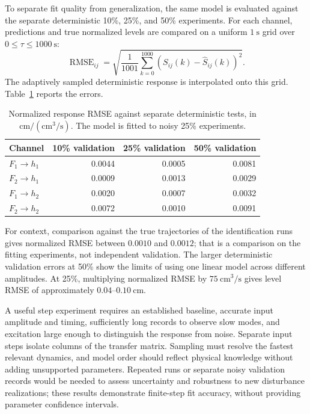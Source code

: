 To separate fit quality from generalization, the same model is evaluated
against the separate deterministic 10\%, 25\%, and 50\% experiments.
For each channel, predictions and true normalized levels are compared
on a uniform $1\ \mathrm{s}$ grid over $0\leq\tau\leq1000\ \mathrm{s}$:
\begin{equation}
 \operatorname{RMSE}_{ij}=
 \sqrt{\frac{1}{1001}\sum_{k=0}^{1000}
  \left(S_{ij}(k)-\widehat S_{ij}(k)\right)^2}.
\end{equation}
The adaptively sampled deterministic response is interpolated onto this
grid. Table~\ref{tab:p4-validation} reports the errors.
\begin{table}[htbp]
 \centering
 \caption{Normalized response RMSE against separate deterministic tests,
 in $\mathrm{cm/(cm^3/s)}$. The model is fitted to noisy 25\% experiments.}
 \label{tab:p4-validation}
 \begin{tabular}{lrrr}
 \hline
 Channel & 10\% validation & 25\% validation & 50\% validation\\
 \hline
 $F_1\to h_1$ & 0.0044 & 0.0005 & 0.0081\\
 $F_2\to h_1$ & 0.0009 & 0.0013 & 0.0029\\
 $F_1\to h_2$ & 0.0020 & 0.0007 & 0.0032\\
 $F_2\to h_2$ & 0.0072 & 0.0010 & 0.0091\\
 \hline
 \end{tabular}
\end{table}
For context, comparison against the true trajectories of the identification
runs gives normalized RMSE between $0.0010$ and $0.0012$; that is a
comparison on the fitting experiments, not independent validation.
The larger deterministic validation errors at 50\% show the limits of
using one linear model across different amplitudes. At 25\%, multiplying
normalized RMSE by $75\ \mathrm{cm^3/s}$ gives level RMSE of approximately
$0.04$--$0.10\ \mathrm{cm}$.

A useful step experiment requires an established baseline, accurate input
amplitude and timing, sufficiently long records to observe slow modes,
and excitation large enough to distinguish the response from noise.
Separate input steps isolate columns of the transfer matrix. Sampling
must resolve the fastest relevant dynamics, and model order should reflect
physical knowledge without adding unsupported parameters. Repeated runs
or separate noisy validation records would be needed to assess uncertainty
and robustness to new disturbance realizations; these results demonstrate
finite-step fit accuracy, without providing parameter confidence intervals.

